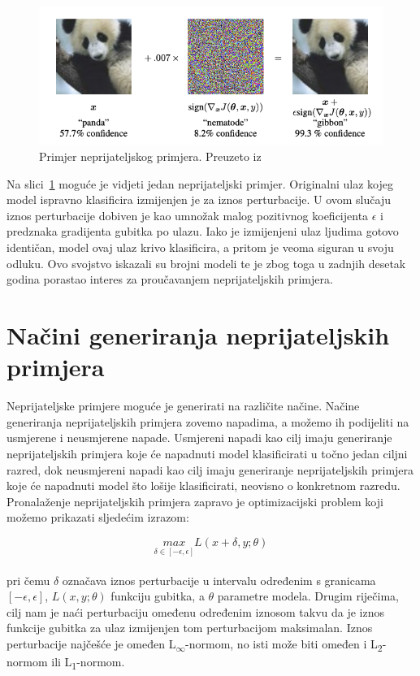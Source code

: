 \documentclass[times, utf8, zavrsni, numeric]{fer}
\begin{document}
\pagebreak

\begin{figure}[htb]
    \centering
    \includegraphics[scale=0.5]{adversarial_example.png}
    \caption{Primjer neprijateljskog primjera. Preuzeto iz \cite{goodfellow2014explaining}}
    \label{fig:adv_example}
\end{figure}

Na slici~\ref{fig:adv_example} moguće je vidjeti jedan neprijateljski primjer.
Originalni ulaz kojeg model ispravno klasificira izmijenjen je za iznos perturbacije.
U ovom slučaju iznos perturbacije dobiven je kao umnožak malog pozitivnog koeficijenta $\epsilon$ i predznaka gradijenta gubitka po ulazu.
Iako je izmijenjeni ulaz ljudima gotovo identičan, model ovaj ulaz krivo klasificira, a pritom je veoma siguran u svoju odluku.
Ovo svojstvo iskazali su brojni modeli te je zbog toga u zadnjih desetak godina porastao interes za proučavanjem neprijateljskih primjera.

\section{Načini generiranja neprijateljskih primjera}

Neprijateljske primjere moguće je generirati na različite načine. 
Načine generiranja neprijateljskih primjera zovemo napadima, a možemo ih podijeliti na usmjerene i neusmjerene napade.
Usmjereni napadi kao cilj imaju generiranje neprijateljskih primjera koje će napadnuti model klasificirati u točno jedan ciljni razred,
dok neusmjereni napadi kao cilj imaju generiranje neprijateljskih primjera koje će napadnuti model što lošije klasificirati, neovisno o konkretnom razredu.
Pronalaženje neprijateljskih primjera zapravo je optimizacijski problem koji možemo prikazati sljedećim izrazom:

\begin{equation}
    \underset{\delta \in [-\epsilon, \epsilon]}{max}L(x + \delta,y;\theta)
    \label{eq:adversarial_optimization}
\end{equation}
\\
pri čemu $\delta$ označava iznos perturbacije u intervalu određenim s granicama $[-\epsilon, \epsilon]$, $L(x,y;\theta)$ funkciju gubitka, a $\theta$ parametre modela.
Drugim riječima, cilj nam je naći perturbaciju omeđenu određenim iznosom takvu da je iznos funkcije gubitka za ulaz izmijenjen tom perturbacijom maksimalan.
Iznos perturbacije najčešće je omeđen L\textsubscript{$\infty$}-normom, no isti može biti omeđen i L\textsubscript{2}-normom ili L\textsubscript{1}-normom.
\end{document}
